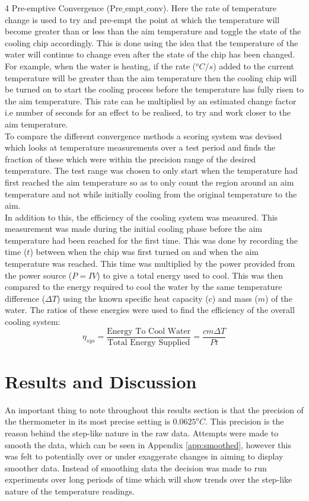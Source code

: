 \documentclass[10pt]{article}
\begin{document}
4 Pre-emptive Convergence (Pre$\_$empt$\_$conv). Here the rate of temperature change is used to try and pre-empt the point at which the temperature will become greater than or less than the aim temperature and toggle the state of the cooling chip accordingly. This is done using the idea that the temperature of the water will continue to change even after the state of the chip has been changed. For example, when the water is heating, if the rate ($^oC/s$) added to the current temperature will be greater than the aim temperature then the cooling chip will be turned on to start the cooling process before the temperature has fully risen to the aim temperature. This rate can be multiplied by an estimated change factor i.e number of seconds for an effect to be realised, to try and work closer to the aim temperature.\\

To compare the different convergence methods a scoring system was devised which looks at temperature measurements over a test period and finds the fraction of these which were within the precision range of the desired temperature. The test range was chosen to only start when the temperature had first reached the aim temperature so as to only count the region around an aim temperature and not while initially cooling from the original temperature to the aim.   \\

In addition to this, the efficiency of the cooling system was measured. This measurement was made during the initial cooling phase before the aim temperature had been reached for the first time. This was done by recording the time ($t$) between when the chip was first turned on and when the aim temperature was reached. This time was multiplied by the power provided from the power source ($P=IV$) to give a total energy used to cool. This was then compared to the energy required to cool the water by the same temperature difference ($\Delta T$) using the known specific heat capacity ($c$) and mass ($m$) of the water. The ratios of these energies were used to find the efficiency of the overall cooling system:
\begin{equation}
    \eta_{sys} = \frac{\text{Energy To Cool Water}}{\text{Total Energy Supplied}} = \frac{cm\Delta T}{Pt}
\end{equation}


\section*{Results and Discussion}
An important thing to note throughout this results section is that the precision of the thermometer in its most precise setting is $0.0625^oC$. This precision is the reason behind the step-like nature in the raw data. Attempts were made to smooth the data, which can be seen in Appendix \ref{app:smoothed}, however this was felt to potentially over or under exaggerate changes in aiming to display smoother data. Instead of smoothing data the decision was made to run experiments over long periods of time which will show trends over the step-like nature of the temperature readings. \\
\end{document}
